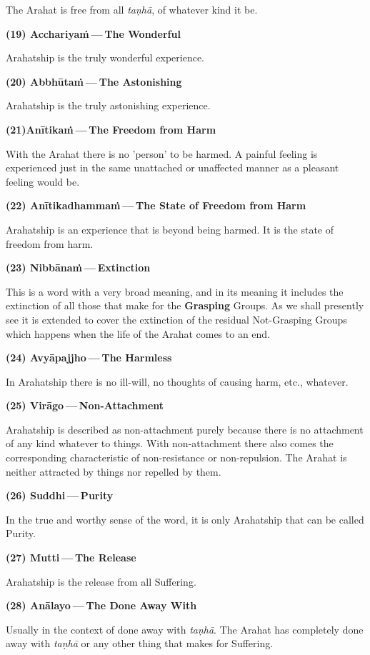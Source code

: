 The Arahat is free from all \emph{taṇhā}, of whatever kind it be.

\textbf{(19) Acchariyaṁ --- The Wonderful}

Arahatship is the truly wonderful experience.

\textbf{(20) Abbhūtaṁ --- The Astonishing}

Arahatship is the truly astonishing experience.

\textbf{(21)Anītikaṁ --- The Freedom from Harm}

With the Arahat there is no 'person' to be harmed. A painful feeling is experienced just in the same unattached or unaffected manner as a pleasant feeling would be.

\textbf{(22) Anītikadhammaṁ --- The State of Freedom from Harm}

Arahatship is an experience that is beyond being harmed. It is the state of freedom from harm.

\textbf{(23) Nibbānaṁ --- Extinction}

This is a word with a very broad meaning, and in its meaning it includes the extinction of all those that make for the \textbf{Grasping} Groups. As we shall presently see it is extended to cover the extinction of the residual Not-Grasping Groups which happens when the life of the Arahat comes to an end.

\textbf{(24) Avyāpajjho --- The Harmless}

In Arahatship there is no ill-will, no thoughts of causing harm, etc., whatever.

\textbf{(25) Virāgo --- Non-Attachment}

Arahatship is described as non-attachment purely because there is no attachment of any kind whatever to things. With non-attachment there also comes the corresponding characteristic of non-resistance or non-repulsion. The Arahat is neither attracted by things nor repelled by them.

\textbf{(26) Suddhi --- Purity}

\protect\hypertarget{suddhi}{}{}In the true and worthy sense of the word, it is only Arahatship that can be called Purity.

\textbf{(27) Mutti --- The Release}

Arahatship is the release from all Suffering.

\textbf{(28) Anālayo --- The Done Away With}

Usually in the context of done away with \emph{taṇhā}. The Arahat has completely done away with \emph{taṇhā} or any other thing that makes for Suffering.


